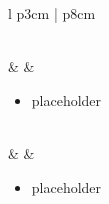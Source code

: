 \documentclass[fontHelvetica, widesubsec]{TechCheck}
\begin{document}
\begin{center}
\begin{longtable}{l p{3cm} | p{8cm}}
\begin{minipage}[t]{\linewidth}
			\end{minipage} \\
			\midrule
			\textbf{\textbullet} &  &
			\begin{minipage}[t]{\linewidth}
				\vspace{-7pt}
				\begin{itemize}
					\item placeholder
				\end{itemize}
			\end{minipage} \\
			\midrule
			\textbf{\textbullet} &  &
			\begin{minipage}[t]{\linewidth}
				\vspace{-7pt}
				\begin{itemize}
					\item placeholder
				\end{itemize}
			\end{minipage} \\
			\bottomrule
		\end{longtable}
	\end{center}
\end{document}
